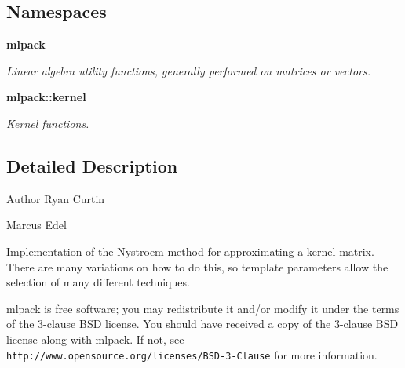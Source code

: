 \subsection*{Namespaces}
\begin{DoxyCompactItemize}
\item 
 \textbf{ mlpack}
\begin{DoxyCompactList}\small\item\em Linear algebra utility functions, generally performed on matrices or vectors. \end{DoxyCompactList}\item 
 \textbf{ mlpack\+::kernel}
\begin{DoxyCompactList}\small\item\em Kernel functions. \end{DoxyCompactList}\end{DoxyCompactItemize}


\subsection{Detailed Description}
\begin{DoxyAuthor}{Author}
Ryan Curtin 

Marcus Edel
\end{DoxyAuthor}
Implementation of the Nystroem method for approximating a kernel matrix. There are many variations on how to do this, so template parameters allow the selection of many different techniques.

mlpack is free software; you may redistribute it and/or modify it under the terms of the 3-\/clause B\+SD license. You should have received a copy of the 3-\/clause B\+SD license along with mlpack. If not, see {\tt http\+://www.\+opensource.\+org/licenses/\+B\+S\+D-\/3-\/\+Clause} for more information. 